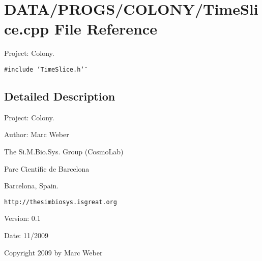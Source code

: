 \section{DATA/PROGS/COLONY/TimeSlice.cpp File Reference}
\label{TimeSlice_8cpp}
Project: Colony. 

{\tt \#include \char`\"{}TimeSlice.h\char`\"{}}\par


\subsection{Detailed Description}
Project: Colony. 

\begin{Desc}
\item[Author:]Marc Weber\par
 The Si.M.Bio.Sys. Group (CosmoLab)\par
 Parc Científic de Barcelona\par
 Barcelona, Spain.\par
 {\tt http://thesimbiosys.isgreat.org} \end{Desc}
\begin{Desc}
\item[Version:]0.1 \end{Desc}
\begin{Desc}
\item[Date:]11/2009\end{Desc}
Copyright 2009 by Marc Weber 
